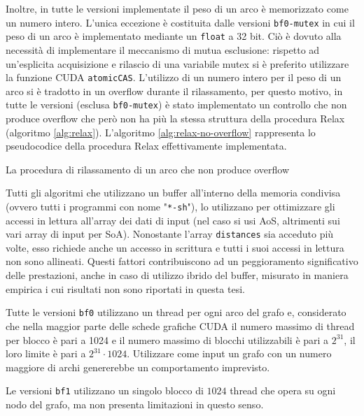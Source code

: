 \documentclass[12pt,a4paper,oneside]{book}
\begin{document}
	Inoltre, in tutte le versioni implementate il peso di un arco è memorizzato come un numero intero. L'unica eccezione è costituita dalle versioni \texttt{bf0-mutex} in cui il peso di un arco è implementato mediante un \texttt{float} a 32 bit. Ciò è dovuto alla necessità di implementare il meccanismo di mutua esclusione: rispetto ad un'esplicita acquisizione e rilascio di una variabile mutex si è preferito utilizzare la funzione CUDA \texttt{atomicCAS}. L'utilizzo di un numero intero per il peso di un arco si è tradotto in un overflow durante il rilassamento, per questo motivo, in tutte le versioni (esclusa \texttt{bf0-mutex}) è stato implementato un controllo che non produce overflow che però non ha più la stessa struttura della procedura Relax (algoritmo \ref{alg:relax}). L'algoritmo \ref{alg:relax-no-overflow} rappresenta lo pseudocodice della procedura Relax effettivamente implementata.
	
	\begin{algorithm}
		\caption{La procedura di rilassamento di un arco che non produce overflow}
		\label{alg:relax-no-overflow}
	\end{algorithm}

	Tutti gli algoritmi che utilizzano un buffer all'interno della memoria condivisa (ovvero tutti i programmi con nome "\texttt{*-sh}"), lo utilizzano per ottimizzare gli accessi in lettura all'array dei dati di input (nel caso si usi AoS, altrimenti sui vari array di input per SoA). Nonostante l'array \texttt{distances} sia acceduto più volte, esso richiede anche un accesso in scrittura e tutti i suoi accessi in lettura non sono allineati. Questi fattori contribuiscono ad un peggioramento significativo delle prestazioni, anche in caso di utilizzo ibrido del buffer, misurato in maniera empirica i cui risultati non sono riportati in questa tesi.
	
	Tutte le versioni \texttt{bf0} utilizzano un thread per ogni arco del grafo e, considerato che nella maggior parte delle schede grafiche CUDA il numero massimo di thread per blocco è pari a 1024 e il numero massimo di blocchi utilizzabili è pari a $2^{31}$, il loro limite è pari a $2^{31}\cdot 1024$. Utilizzare come input un grafo con un numero maggiore di archi genererebbe un comportamento imprevisto.
	
	Le versioni \texttt{bf1} utilizzano un singolo blocco di $1024$ thread che opera su ogni nodo del grafo, ma non presenta limitazioni in questo senso.
	
\end{document}
